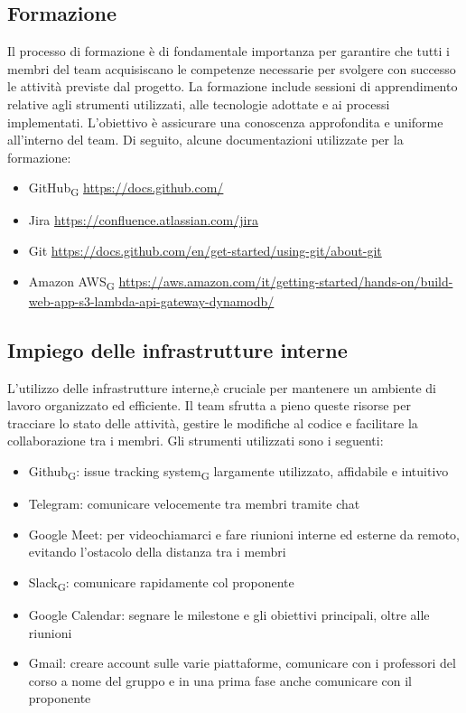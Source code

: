 \documentclass{article}
\begin{document}
\subsection{Formazione}
Il processo di formazione è di fondamentale importanza per garantire che tutti i membri del team acquisiscano le competenze necessarie per svolgere con successo le attività previste dal progetto. La formazione include sessioni di apprendimento relative agli strumenti utilizzati, alle tecnologie adottate e ai processi implementati. L'obiettivo è assicurare una conoscenza approfondita e uniforme all'interno del team. Di seguito, alcune documentazioni utilizzate per la formazione:
\begin{itemize}
    \item GitHub\textsubscript{G} \href{https://docs.github.com/}{https://docs.github.com/}
    \item Jira \href{https://confluence.atlassian.com/jira}{https://confluence.atlassian.com/jira}
    \item Git \href{https://docs.github.com/en/get-started/using-git/about-git}{https://docs.github.com/en/get-started/using-git/about-git}
    \item Amazon AWS\textsubscript{G} \href{https://aws.amazon.com/it/getting-started/hands-on/build-web-app-s3-lambda-api-gateway-dynamodb/}{https://aws.amazon.com/it/getting-started/hands-on/build-web-app-s3-lambda-api-gateway-dynamodb/}
\end{itemize}

\subsection{Impiego delle infrastrutture interne}
L'utilizzo delle infrastrutture interne,è cruciale per mantenere un ambiente di lavoro organizzato ed efficiente. Il team sfrutta a pieno queste risorse per tracciare lo stato delle attività, gestire le modifiche al codice e facilitare la collaborazione tra i membri. Gli strumenti utilizzati sono i seguenti:
\begin{itemize}
    \item Github\textsubscript{G}: issue tracking system\textsubscript{G} largamente utilizzato, affidabile e intuitivo
    \item Telegram: comunicare velocemente tra membri tramite chat
    \item Google Meet: per videochiamarci e fare riunioni interne ed esterne da remoto, evitando l'ostacolo della distanza tra i membri
    \item Slack\textsubscript{G}: comunicare rapidamente col proponente
    \item Google Calendar: segnare le milestone e gli obiettivi principali, oltre alle riunioni
    \item Gmail: creare account sulle varie piattaforme, comunicare con i professori del corso a nome del gruppo e in una prima fase anche comunicare con il proponente
    
\end{itemize}
\end{document}
